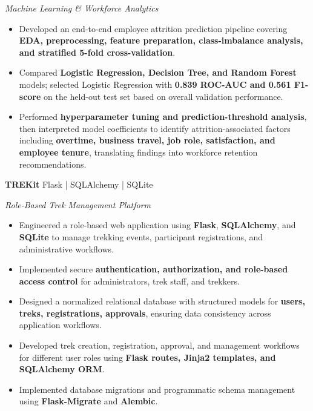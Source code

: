 \documentclass[10pt,a4paper]{article}
\begin{document}
\textit{Machine Learning \& Workforce Analytics}

\begin{itemize}[leftmargin=15pt,itemsep=1pt,topsep=1pt,parsep=0pt,partopsep=0pt]

\item Developed an end-to-end employee attrition prediction pipeline covering \textbf{EDA, preprocessing, feature preparation, class-imbalance analysis, and stratified 5-fold cross-validation}.

\item Compared \textbf{Logistic Regression, Decision Tree, and Random Forest} models; selected Logistic Regression with \textbf{0.839 ROC-AUC and 0.561 F1-score} on the held-out test set based on overall validation performance.

\item Performed \textbf{hyperparameter tuning and prediction-threshold analysis}, then interpreted model coefficients to identify attrition-associated factors including \textbf{overtime, business travel, job role, satisfaction, and employee tenure}, translating findings into workforce retention recommendations.

\end{itemize}

\vspace{2pt}

\textbf{TREKit} \hfill Flask | SQLAlchemy | SQLite

\textit{Role-Based Trek Management Platform}

\begin{itemize}[leftmargin=15pt,itemsep=1pt,topsep=1pt,parsep=0pt,partopsep=0pt]

\item Engineered a role-based web application using \textbf{Flask}, \textbf{SQLAlchemy}, and \textbf{SQLite} to manage trekking events, participant registrations, and administrative workflows.

\item Implemented secure \textbf{authentication, authorization, and role-based access control} for administrators, trek staff, and trekkers.

\item Designed a normalized relational database with structured models for \textbf{users, treks, registrations, approvals}, ensuring data consistency across application workflows.

\item Developed trek creation, registration, approval, and management workflows for different user roles using \textbf{Flask routes, Jinja2 templates, and SQLAlchemy ORM}.

\item Implemented database migrations and programmatic schema management using \textbf{Flask-Migrate} and \textbf{Alembic}.

\end{itemize}
\end{document}
